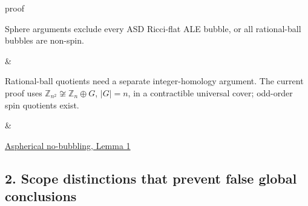 \documentclass[
  10pt,
]{article}
\begin{document}
\begin{longtable}[]
\begin{minipage}[t]{0.30\columnwidth}
{proof}\strut
\end{minipage}\tabularnewline
\begin{minipage}[t]{0.30\columnwidth}\raggedright
Sphere arguments exclude every ASD Ricci-flat ALE bubble, or all
rational-ball bubbles are non-spin.\strut
\end{minipage} & \begin{minipage}[t]{0.30\columnwidth}\raggedright
Rational-ball quotients need a separate integer-homology argument. The
current proof uses \(\mathbb Z_{n^2}\not\cong\mathbb Z_n\oplus G\),
\(|G|=n\), in a contractible universal cover; odd-order spin quotients
exist.\strut
\end{minipage} & \begin{minipage}[t]{0.30\columnwidth}\raggedright
\href{../mathematics/current/line1_aspherical_no_bubbles.md}{Aspherical
no-bubbling, Lemma 1}\strut
\end{minipage}\tabularnewline
\bottomrule
\end{longtable}

\hypertarget{scope-distinctions-that-prevent-false-global-conclusions}{%
\subsection{2. Scope distinctions that prevent false global
conclusions}\label{scope-distinctions-that-prevent-false-global-conclusions}}
\end{document}
